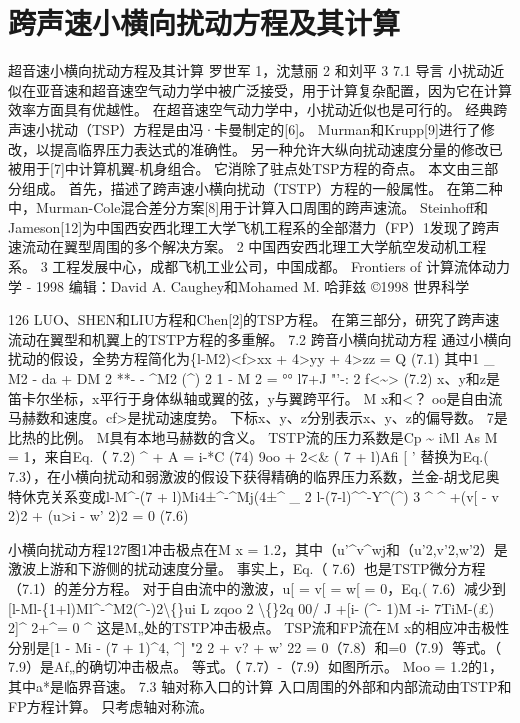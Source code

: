 \documentclass[UTF8,11pt,a4paper,openany,fontset=fandol]{ctexbook}
\begin{document}
\chapter{跨声速小横向扰动方程及其计算}
超音速小横向扰动方程及其计算 罗世军 1，沈慧丽 2 和刘平 3 7.1 导言 小扰动近似在亚音速和超音速空气动力学中被广泛接受，用于计算复杂配置，因为它在计算效率方面具有优越性。 在超音速空气动力学中，小扰动近似也是可行的。 经典跨声速小扰动（TSP）方程是由冯·卡曼制定的[6]。 Murman和Krupp[9]进行了修改，以提高临界压力表达式的准确性。 另一种允许大纵向扰动速度分量的修改已被用于[7]中计算机翼-机身组合。 它消除了驻点处TSP方程的奇点。 本文由三部分组成。 首先，描述了跨声速小横向扰动（TSTP）方程的一般属性。 在第二种中，Murman-Cole混合差分方案[8]用于计算入口周围的跨声速流。 Steinhoff和Jameson[12]为中国西安西北理工大学飞机工程系的全部潜力（FP）1发现了跨声速流动在翼型周围的多个解决方案。 2 中国西安西北理工大学航空发动机工程系。 3 工程发展中心，成都飞机工业公司，中国成都。 Frontiers of 计算流体动力学 - 1998 编辑：David A. Caughey和Mohamed M. 哈菲兹 ©1998 世界科学

126 LUO、SHEN和LIU方程和Chen[2]的TSP方程。 在第三部分，研究了跨声速流动在翼型和机翼上的TSTP方程的多重解。 7.2 跨音小横向扰动方程 通过小横向扰动的假设，全势方程简化为\{l-M2)<f>xx + 4>yy + 4>zz = Q (7.1) 其中1 \_ M2 - da + DM 2 **- - \textasciicircum{}M2 (\textasciicircum{}) 2 1 - M 2 = °° l7+J "'-: 2 f<\textasciitilde{}> (7.2) x、y和z是笛卡尔坐标，x平行于身体纵轴或翼的弦，y与翼跨平行。 M x和<？ oo是自由流马赫数和速度。cf>是扰动速度势。 下标x、y、z分别表示x、y、z的偏导数。 7是比热的比例。 M具有本地马赫数的含义。 TSTP流的压力系数是Cp \textasciitilde{} iMl As M = 1，来自Eq.（ 7.2) \textasciicircum{} + A = i-*C (74) 9oo + 2<\& ( 7 + l)Afi [ ' 替换为Eq.( 7.3），在小横向扰动和弱激波的假设下获得精确的临界压力系数，兰金-胡戈尼奥特休克关系变成l-M\textasciicircum{}-(7 + l)Mi4±\textasciicircum{}-\textasciicircum{}Mj(4±\textasciicircum{} \_ 2 l-(7-l)\textasciicircum{}\textasciicircum{}-Y\textasciicircum{}(\textasciicircum{}) 3 \textasciicircum{} \textasciicircum{} +(v[ - v 2)2 + (u>i - w' 2)2 = 0 (7.6)

小横向扰动方程127图1冲击极点在M x = 1.2，其中（u'\textasciicircum{}v\textasciicircum{}wj和（u'2,v'2,w'2）是激波上游和下游侧的扰动速度分量。 事实上，Eq.（ 7.6）也是TSTP微分方程（7.1）的差分方程。 对于自由流中的激波，u[ = v[ = w[ = 0，Eq.( 7.6）减少到[l-Ml-\{1+l)Ml\textasciicircum{}-\textasciicircum{}M2(\textasciicircum{}-)2\textbackslash\{\}ui L zqoo 2 \textbackslash\{\}2q 00/ J +[i- (\textasciicircum{}- 1)M -i- 7TiM-(£) 2]\textasciicircum{} 2+\textasciicircum{}= 0 \textasciicircum{} 这是M„处的TSTP冲击极点。 TSP流和FP流在M x的相应冲击极性分别是[1 - Mi - (7 + 1)\textasciicircum{}4, \textasciicircum{}] "2 2 + v? + w' 22 = 0（7.8）和=0（7.9）等式。（ 7.9）是Af„的确切冲击极点。 等式。（ 7.7）-（7.9）如图所示。 Moo = 1.2的1，其中a*是临界音速。 7.3 轴对称入口的计算 入口周围的外部和内部流动由TSTP和FP方程计算。 只考虑轴对称流。
\end{document}
